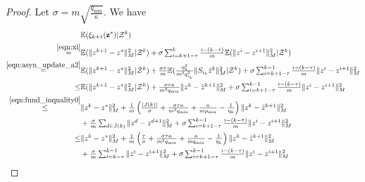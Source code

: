 \begin{proof}Let $\sigma=m\sqrt{\frac{q_{\min}}{\kappa}}$. We have 
\begin{align*}
~&\mathbb{E} (\xi_{k+1}(\vz^*) | \cZ^k)  \\
\overset{\eqref{eqn:xi}}= & \textstyle \mathbb{E} (\|z^{k+1} - z^*\|_M^2| \cZ^k)
+ \sigma\sum_{i=k+1-\tau}^{k} \frac{i-(k-\tau)}{m} \mathbb{E} (\| z^{ i} -
z^{i+1}\|_M^2 | \cZ^k) \\
  \overset{\eqref{eqn:asyn_update_a2}}= & \textstyle\mathbb{E} (\|z^{k+1} -
  z^*\|_M^2| \cZ^k) + \frac{\sigma\tau}{m}
  \mathbb{E}(\frac{\eta_k^2}{m^2q_{i_k}^2}\| S_{i_k}\hat z^k\|_M^2|\cZ^k) + 
  \sigma\sum_{i=k+1-\tau}^{k-1} \frac{i-(k-\tau)}{m} \| z^{i} - z^{i+1}\|_M^2\\
          \le & \textstyle\mathbb{E} (\|z^{k+1} - z^*\|_M^2| \cZ^k) +
          \frac{\sigma\tau\kappa}{m^3q_{\min}} \| z^{k } -
          \bar{z}^{k+1}\|_M^2 + \sigma\sum_{i=k+1-\tau}^{k-1} \frac{i-(k-\tau)}{m} \| z^{i} -
          z^{i+1}\|_M^2\\
  \overset{\eqref{eqn:fund_inquality0}}\leq &\textstyle\|z^k - z^*\|_M^2 +
  \frac{1}{m} \left({|J(k)|\over \sigma} +
  \frac{\sigma\tau\kappa}{m^2q_{\min}} +
  {\kappa\over mp_{\min}} - \frac{1}{\eta_k}\right) \|z^k -
  \bar{z}^{k+1}\|_M^2   \\
&\textstyle+\frac{\sigma}{m}\sum_{d\in J(k)}\|{z}^{d} - {z}^{d+1}\|_M^2 + 
\sigma\sum_{i=k+1-\tau}^{k-1} \frac{i-(k-\tau)}{m} \| z^{i} - z^{i+1}\|_M^2\\
 \leq &\textstyle\|z^k - z^*\|_M^2 + \frac{1}{m} \left({\tau\over \sigma} +
 \frac{\sigma\tau\kappa}{m^2q_{\min}} +
 {\kappa\over mq_{\min}} - \frac{1}{ \eta_k}\right) \|z^k -
 \bar{z}^{k+1}\|_M^2   \\
&\textstyle+\frac{\sigma}{m}\sum_{i=k-\tau}^{k - 1}\|{z}^{i} - {z}^{i+1}\|_M^2 + 
\sigma\sum_{i=k+1-\tau}^{k-1} \frac{i-(k-\tau)}{m} \| z^{i} - z^{i+1}\|_M^2\\

\end{align*}
\end{proof}
